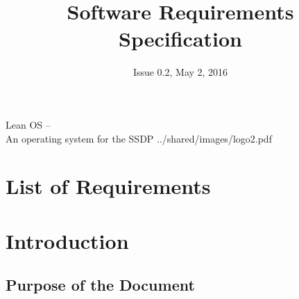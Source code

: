 

\title{Software Requirements Specification}
\def \documentid {LEANOS-UVIE-SRS-001}
\date{Issue 0.2, May 2, 2016}

\newcommand\affil[1]{\textsuperscript#1}

\def\preparedby {Armin Luntzer\affil{1}}
\def\checkedby {Roland Ottensamer\affil{1}}
\def\approvedby {Franz Kerschbaum\affil{1}}

\def\affiliations{
	\affil{1} Department of Astrophysics, University of Vienna
}









\usepackage{vhistory}

\usepackage{biblatex}


\rereadauxrequirementlabels

\exportrequirements





\setmainfont{MyriadPro-SemiCondensed}
\uvietitlepage%
{Lean OS --\\ An operating system for the SSDP}%
{\doctitle}%
{../shared/images/logo2.pdf}
\setmainfont{MyriadPro}

\approvalpage

\tableofcontents
\newpage


\chapter*{List of Requirements}
\the\requirementlist


\begin{versionhistory}
\end{versionhistory}


\chapter{Introduction}

\section{Purpose of the Document}

